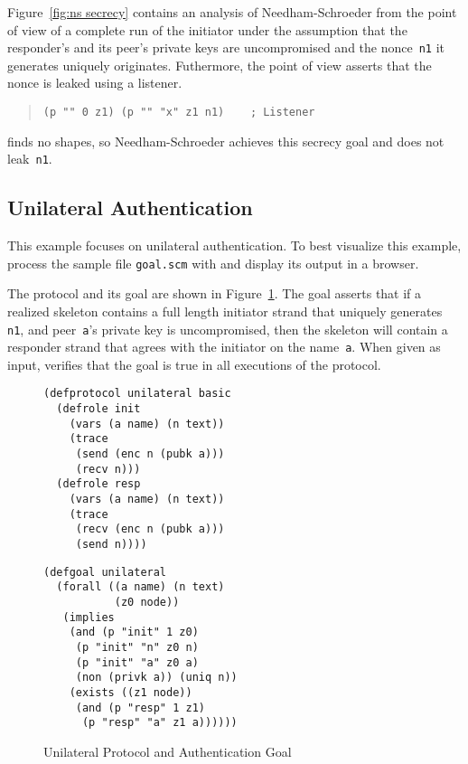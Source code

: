 \documentclass[12pt]{article}
\begin{document}
Figure~\ref{fig:ns secrecy} contains an analysis of Needham-Schroeder
from the point of view of a complete run of the initiator under the
assumption that the responder's and its peer's private keys are
uncompromised and the nonce~\texttt{n1} it generates uniquely
originates.  Futhermore, the point of view asserts that the nonce is
leaked using a listener.
\begin{quote}
\begin{verbatim}
(p "" 0 z1) (p "" "x" z1 n1)    ; Listener
\end{verbatim}
\end{quote}

{\cpsa} finds no shapes, so Needham-Schroeder achieves this secrecy
goal and does not leak~\texttt{n1}.

\subsection{Unilateral Authentication}\label{sec:unilateral}

This example focuses on unilateral authentication.  To best visualize
this example, process the sample file \texttt{goal.scm} with {\cpsa}
and display its output in a browser.

The protocol and its goal are shown in Figure~\ref{fig:unilateral}.
The goal asserts that if a realized skeleton contains a full length
initiator strand that uniquely generates \texttt{n1}, and
peer~\texttt{a}'s private key is uncompromised, then the skeleton will
contain a responder strand that agrees with the initiator on the
name~\texttt{a}.  When given as input, {\cpsa} verifies that the goal
is true in all executions of the protocol.

\begin{figure}
\begin{minipage}{2.7in}
\begin{verbatim}
(defprotocol unilateral basic
  (defrole init
    (vars (a name) (n text))
    (trace
     (send (enc n (pubk a)))
     (recv n)))
  (defrole resp
    (vars (a name) (n text))
    (trace
     (recv (enc n (pubk a)))
     (send n))))
\end{verbatim}
\end{minipage}\hfil
\begin{minipage}{3.0in}
\begin{verbatim}
(defgoal unilateral
  (forall ((a name) (n text)
           (z0 node))
   (implies
    (and (p "init" 1 z0)
     (p "init" "n" z0 n)
     (p "init" "a" z0 a)
     (non (privk a)) (uniq n))
    (exists ((z1 node))
     (and (p "resp" 1 z1)
      (p "resp" "a" z1 a))))))
\end{verbatim}
\end{minipage}
\caption{Unilateral Protocol and Authentication Goal}\label{fig:unilateral}
\end{figure}
\end{document}
